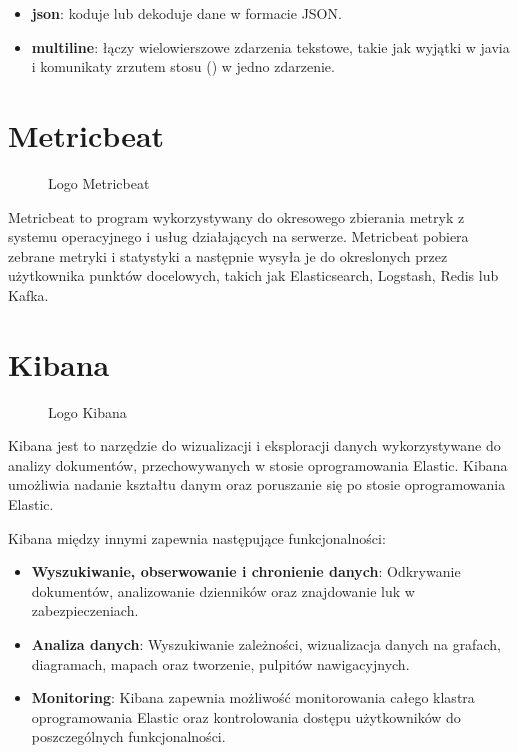 \begin{itemize}
    \item \textbf{json}: koduje lub dekoduje dane w formacie JSON\cite{logstashManualHowItWorks}.
    \item \textbf{multiline}: łączy wielowierszowe zdarzenia tekstowe, takie jak wyjątki w javia i komunikaty zrzutem stosu () w jedno zdarzenie\cite{logstashManualHowItWorks}.
\end{itemize}

\section{Metricbeat}


\begin{figure}[!htbp]
    \centering
    
    \caption{Logo Metricbeat\cite{metricbeatLogo}}
    \label{fig:enter-label}
\end{figure}

Metricbeat to program wykorzystywany do okresowego zbierania metryk z systemu operacyjnego i usług działających na serwerze. Metricbeat pobiera zebrane metryki i statystyki a następnie wysyła je do okreslonych przez użytkownika punktów docelowych, takich jak Elasticsearch, Logstash, Redis lub Kafka\cite{metricbeatOverview}.


\section{Kibana}

\begin{figure}[!htbp]
    \centering
    
    \caption{Logo Kibana\cite{kibanaLogo}}
    \label{fig:enter-label}
\end{figure}

Kibana jest to narzędzie do wizualizacji i eksploracji danych wykorzystywane do analizy dokumentów, przechowywanych w stosie oprogramowania Elastic. Kibana umożliwia nadanie kształtu danym oraz poruszanie się po stosie oprogramowania Elastic\cite{kibanaOverview}. 

Kibana między innymi zapewnia następujące funkcjonalności:

\begin{itemize}
    \item \textbf{Wyszukiwanie, obserwowanie i chronienie danych}: Odkrywanie dokumentów,  analizowanie dzienników oraz znajdowanie luk w zabezpieczeniach\cite{kibanaOverview}.
    \item \textbf{Analiza danych}: Wyszukiwanie zależności, wizualizacja danych na grafach, diagramach, mapach oraz tworzenie, pulpitów nawigacyjnych\cite{kibanaOverview}.
    \item \textbf{Monitoring}: Kibana zapewnia możliwość monitorowania całego klastra oprogramowania Elastic oraz kontrolowania dostępu użytkowników do poszczególnych funkcjonalności\cite{kibanaOverview}.
\end{itemize}

